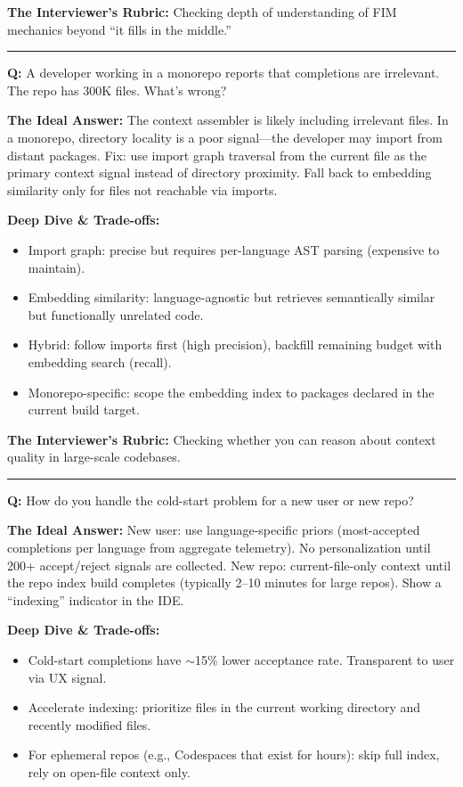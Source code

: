 \textbf{The Interviewer's Rubric:} Checking depth of understanding of FIM mechanics beyond ``it fills in the middle.''

\bigskip\hrule\bigskip

\textbf{Q:} A developer working in a monorepo reports that completions are irrelevant. The repo has 300K files. What's wrong?

\textbf{The Ideal Answer:} The context assembler is likely including irrelevant files. In a monorepo, directory locality is a poor signal---the developer may import from distant packages. Fix: use import graph traversal from the current file as the primary context signal instead of directory proximity. Fall back to embedding similarity only for files not reachable via imports.

\textbf{Deep Dive \& Trade-offs:}
\begin{itemize}
  \item Import graph: precise but requires per-language AST parsing (expensive to maintain).
  \item Embedding similarity: language-agnostic but retrieves semantically similar but functionally unrelated code.
  \item Hybrid: follow imports first (high precision), backfill remaining budget with embedding search (recall).
  \item Monorepo-specific: scope the embedding index to packages declared in the current build target.
\end{itemize}

\textbf{The Interviewer's Rubric:} Checking whether you can reason about context quality in large-scale codebases.

\bigskip\hrule\bigskip

\textbf{Q:} How do you handle the cold-start problem for a new user or new repo?

\textbf{The Ideal Answer:} New user: use language-specific priors (most-accepted completions per language from aggregate telemetry). No personalization until 200+ accept/reject signals are collected. New repo: current-file-only context until the repo index build completes (typically 2--10 minutes for large repos). Show a ``indexing'' indicator in the IDE.

\textbf{Deep Dive \& Trade-offs:}
\begin{itemize}
  \item Cold-start completions have $\sim$15\% lower acceptance rate. Transparent to user via UX signal.
  \item Accelerate indexing: prioritize files in the current working directory and recently modified files.
  \item For ephemeral repos (e.g., Codespaces that exist for hours): skip full index, rely on open-file context only.
\end{itemize}

